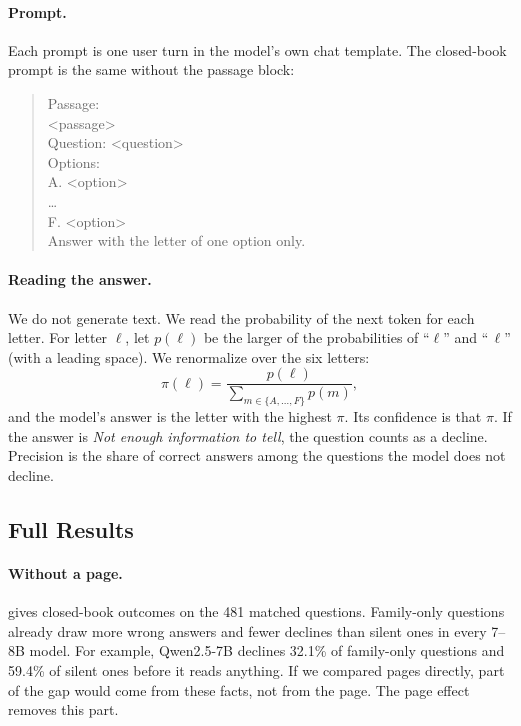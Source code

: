 \paragraph{Prompt.}
Each prompt is one user turn in the model's own chat template. The closed-book prompt is the same without the passage block:
\begin{quote}
\footnotesize\ttfamily
Passage:\\
<passage>\\[2pt]
Question: <question>\\
Options:\\
A. <option>\\
\ldots\\
F. <option>\\
Answer with the letter of one option only.
\end{quote}

\paragraph{Reading the answer.}
We do not generate text. We read the probability of the next token for each letter. For letter $\ell$, let $p(\ell)$ be the larger of the probabilities of ``$\ell$'' and ``\,$\ell$'' (with a leading space). We renormalize over the six letters:
\begin{equation}
\pi(\ell)=\frac{p(\ell)}{\sum_{m\in\{A,\dots,F\}}p(m)},
\end{equation}
and the model's answer is the letter with the highest $\pi$. Its confidence is that $\pi$. If the answer is \emph{Not enough information to tell}, the question counts as a decline. Precision is the share of correct answers among the questions the model does not decline.

\subsection{Full Results}

\paragraph{Without a page.}
 gives closed-book outcomes on the 481 matched questions. Family-only questions already draw more wrong answers and fewer declines than silent ones in every 7--8B model. For example, Qwen2.5-7B declines 32.1\% of family-only questions and 59.4\% of silent ones before it reads anything. If we compared pages directly, part of the gap would come from these facts, not from the page. The page effect removes this part.

